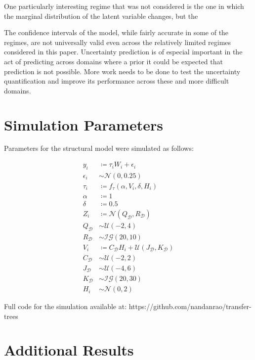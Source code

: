 \documentclass[a4paper,12pt]{article}
\theoremstyle{proposition}
\DeclareMathOperator*{\D}{\mathcal{D}}
\begin{document}
One particularly interesting regime that was not considered is the one in which the marginal distribution of the latent variable changes, but the

The confidence intervals of the model, while fairly accurate in some of the regimes, are not universally valid even across the relatively limited regimes considered in this paper. Uncertainty prediction is of especial important in the act of predicting across domains where a prior it could be expected that prediction is not possible. More work needs to be done to test the uncertainty quantification and improve its performance across these and more difficult domains.



\printbibliography

\begin{appendices}

\section{Simulation Parameters}
\label{appendix:simulation-parameters}

Parameters for the structural model were simulated as follows:

\begin{align*}
y_i &\coloneqq \tau_i W_i + \epsilon_i \\
\epsilon_i &\sim \mathcal{N}(0, 0.25) \\
\tau_i &\coloneqq f_{\tau}(\alpha, V_i, \delta,  H_i) \\
\alpha &\coloneqq 1 \\
\delta &\coloneqq 0.5 \\
Z_i &\coloneqq \mathcal{N}(Q_{\D}, R_{\D}) \\
Q_{\D} &\sim \mathcal{U}(-2, 4)\\
R_{\D} &\sim \mathcal{IG}(20, 10)\\
V_i &\coloneqq C_{\D} H_i + \mathcal{U}(J_{\D}, K_{\D}) \\
C_{\D} &\sim \mathcal{U}(-2, 2) \\
J_{\D} &\sim \mathcal{U}(-4, 6) \\
K_{\D} &\sim \mathcal{IG}(20, 30) \\
H_i &\sim \mathcal{N}(0, 2)
\end{align*}

\noindent Full code for the simulation available at: https://github.com/nandanrao/transfer-trees

\section{Additional Results}


\end{appendices}
\end{document}
